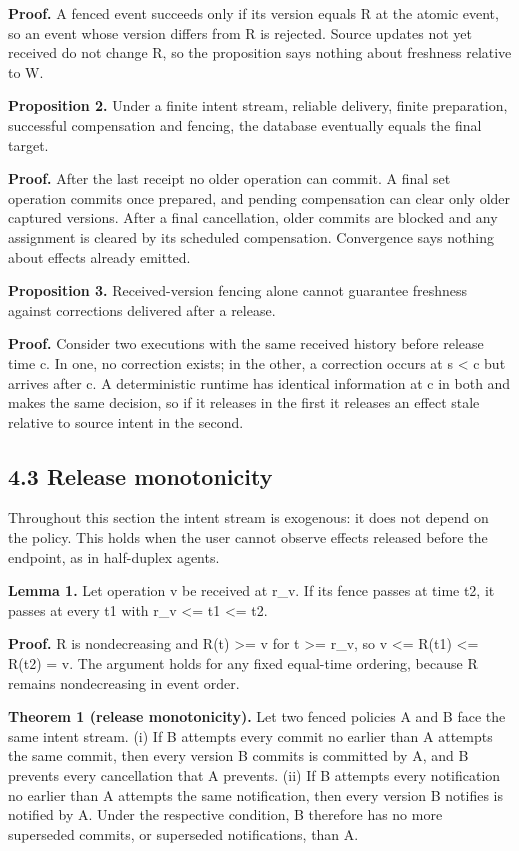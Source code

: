 \documentclass[review,12pt]{elsarticle}
\begin{document}
\textbf{Proof.} A fenced event succeeds only if its version equals R at the atomic event, so an event whose version differs from R is rejected. Source updates not yet received do not change R, so the proposition says nothing about freshness relative to W.


\textbf{Proposition 2.} Under a finite intent stream, reliable delivery, finite preparation, successful compensation and fencing, the database eventually equals the final target.


\textbf{Proof.} After the last receipt no older operation can commit. A final set operation commits once prepared, and pending compensation can clear only older captured versions. After a final cancellation, older commits are blocked and any assignment is cleared by its scheduled compensation. Convergence says nothing about effects already emitted.


\textbf{Proposition 3.} Received-version fencing alone cannot guarantee freshness against corrections delivered after a release.


\textbf{Proof.} Consider two executions with the same received history before release time c. In one, no correction exists; in the other, a correction occurs at s < c but arrives after c. A deterministic runtime has identical information at c in both and makes the same decision, so if it releases in the first it releases an effect stale relative to source intent in the second.


\subsection*{4.3 Release monotonicity}

Throughout this section the intent stream is exogenous: it does not depend on the policy. This holds when the user cannot observe effects released before the endpoint, as in half-duplex agents.


\textbf{Lemma 1.} Let operation v be received at r\_\allowbreak{}v. If its fence passes at time t2, it passes at every t1 with r\_\allowbreak{}v <= t1 <= t2.


\textbf{Proof.} R is nondecreasing and R(t) >= v for t >= r\_\allowbreak{}v, so v <= R(t1) <= R(t2) = v. The argument holds for any fixed equal-time ordering, because R remains nondecreasing in event order.


\textbf{Theorem 1 (release monotonicity).} Let two fenced policies A and B face the same intent stream. (i) If B attempts every commit no earlier than A attempts the same commit, then every version B commits is committed by A, and B prevents every cancellation that A prevents. (ii) If B attempts every notification no earlier than A attempts the same notification, then every version B notifies is notified by A. Under the respective condition, B therefore has no more superseded commits, or superseded notifications, than A.
\end{document}
